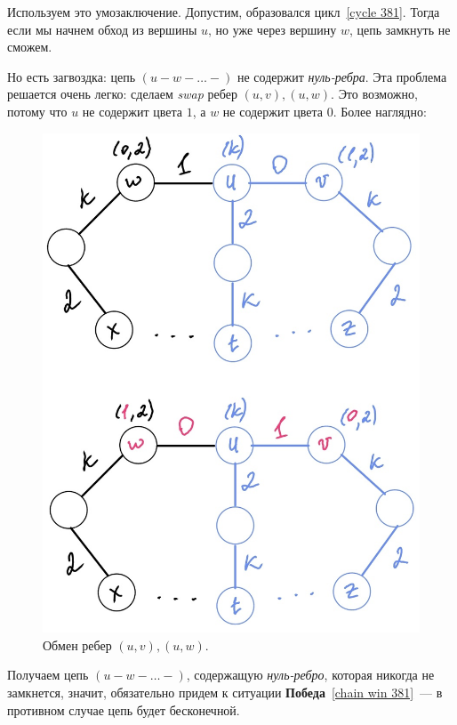 Используем это умозаключение. Допустим, образовался цикл~\ref{cycle 381}. Тогда если мы начнем обход из вершины \(u\), но уже через вершину \(w\), цепь замкнуть не сможем.

Но есть загвоздка: цепь \((u-w-\ldots-)\) не содержит \emph{нуль-ребра}. Эта проблема решается очень легко: сделаем \emph{swap} ребер \((u, v), (u, w)\). Это возможно, потому что \(u\) не содержит цвета \(1\), а \(w\) не содержит цвета \(0\). Более наглядно:
\begin{figure}[H]
    \centering
    \includegraphics[scale=0.3]{Fall/img/solution-381_main_swap.jpg}
    \caption{Обмен ребер \((u, v), (u, w)\).} \label{main swap 381}
\end{figure}

Получаем цепь \((u-w-\ldots-)\), содержащую \emph{нуль-ребро}, которая никогда не замкнется, значит, обязательно придем к ситуации \textbf{Победа}~\eqref{chain win 381}~--- в противном случае цепь будет бесконечной.


